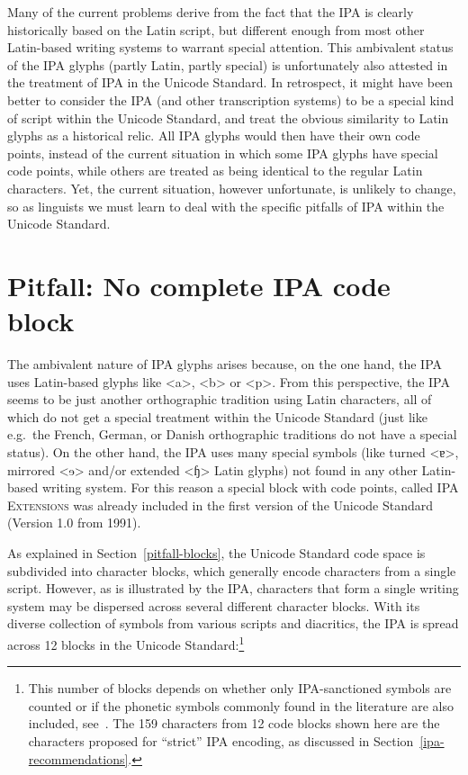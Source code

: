 Many of the current problems derive from the fact that the IPA is clearly
historically based on the Latin script, but different enough from most other
Latin-based writing systems to warrant special attention. This ambivalent status
of the IPA glyphs (partly Latin, partly special) is unfortunately also attested
in the treatment of IPA in the Unicode Standard. In retrospect, it might have
been better to consider the IPA (and other transcription systems) to be a
special kind of script within the Unicode Standard, and treat the obvious
similarity to Latin glyphs as a historical relic. All IPA glyphs would then have
their own code points, instead of the current situation in which some IPA glyphs
have special code points, while others are treated as being identical to the
regular Latin characters. Yet, the current situation, however unfortunate, is
unlikely to change, so as linguists we must learn to deal with the specific
pitfalls of IPA within the Unicode Standard. 

\section{Pitfall: No complete IPA code block}
\label{pitfall-no-complete-ipa-block}

The ambivalent nature of IPA glyphs arises because, on the one hand, the IPA
uses Latin-based glyphs like <a>, <b> or <p>. From this perspective, the IPA
seems to be just another orthographic tradition using Latin characters, all of
which do not get a special treatment within the Unicode Standard (just like
e.g.~the French, German, or Danish orthographic traditions do not have a special
status). On the other hand, the IPA uses many special symbols (like turned <ɐ>,
mirrored <ɘ> and/or extended <ɧ> Latin glyphs) not found in any other Latin-based
writing system. For this reason a special block with code points, called
\textsc{IPA Extensions} was already included in the first version of the Unicode
Standard (Version 1.0 from 1991).

As explained in Section~\ref{pitfall-blocks}, the Unicode Standard code space is
subdivided into character blocks, which generally encode characters from a
single script. However, as is illustrated by the IPA, characters that form a
single writing system may be dispersed across several different character
blocks. With its diverse collection of symbols from various scripts and
diacritics, the IPA is spread across 12 blocks in the Unicode
Standard:\footnote{This number of blocks depends on whether only IPA-sanctioned
symbols are counted or if the phonetic symbols commonly found in the literature
are also included, see~\cite[Appendix~C]{Moran2012}. The 159 characters from 12 
code blocks shown here are the characters proposed for ``strict'' IPA encoding, 
as discussed in Section~\ref{ipa-recommendations}.}

